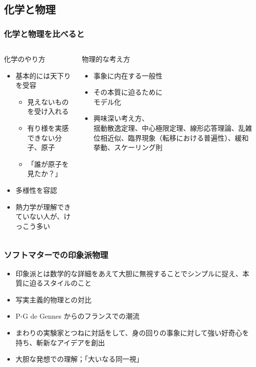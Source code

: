 \documentclass[12pt, dvipdfmx]{beamer}
\begin{document}
\subsection{化学と物理}
\begin{frame}
    \frametitle{化学と物理を比べると}
    \begin{columns}[T, onlytextwidth]
        \begin{block}{化学のやり方}
            \begin{itemize}
                \item 基本的には天下りを受容
                \begin{itemize}
                    \item 見えないものを受け入れる
                    \item 有り様を実感できない分子、原子
                    \item 「誰が原子を見たか？」
                \end{itemize}
                \item 多様性を容認
                \item 熱力学が理解できていない人が、けっこう多い
            \end{itemize}
        \end{block}
        
        \begin{exampleblock}{物理的な考え方}
            \begin{itemize}
                \item 事象に内在する一般性
                \item その本質に迫るために\\モデル化
                \item 興味深い考え方、\\
                揺動散逸定理、中心極限定理、線形応答理論、乱雑位相近似、臨界現象（転移における普遍性）、緩和挙動、スケーリング則
            \end{itemize}
        \end{exampleblock}
    \end{columns}
\end{frame}

\begin{frame}
    \frametitle{ソフトマターでの印象派物理}
    \begin{itemize}
        \item 印象派とは数学的な詳細をあえて大胆に無視することでシンプルに捉え、本質に迫るスタイルのこと
        \item 写実主義的物理との対比
        \item P-G de Gennes からのフランスでの潮流
        \item まわりの実験家とつねに対話をして、身の回りの事象に対して強い好奇心を持ち、斬新なアイデアを創出
        \item 大胆な発想での理解；「大いなる同一視」
    \end{itemize}
\end{frame}
\end{document}
